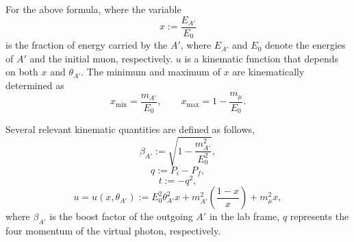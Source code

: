 \documentclass[onecolumn, aps, nofootinbib, prd, preprint, floats, floatfix, amsmath, amssymb, superscriptaddress, preprintnumbers]{revtex4-1}
\begin{document}
For the above formula, where the variable
\begin{equation}
x := \frac{E_{A'}}{E_0}
\label{eq:NA64x}
\end{equation}
is the fraction of energy carried by the $A'$, where $E_{A'}$ and $E_0$ denote the energies of $A'$ and the initial muon, respectively. $u$ is a kinematic function that depends on both $x$ and $\theta_{A'}$.  The minimum and maximum of $x$ are kinematically determined as ~\cite{kirpichnikov2021probing}
\begin{equation}
x_{\min} = \frac{m_{A'}}{E_0}, \qquad x_{\max} = 1 - \frac{m_{\mu}}{E_0}.
\label{eq:xmax}
\end{equation}

Several relevant kinematic quantities are defined as follows,
\begin{equation}
\beta_{A'} := \sqrt{1 - \frac{m_{A'}^2}{E_0^2}},
\label{eq:beta}
\end{equation}
\begin{equation}
q := P_i - P_f,
\label{q}
\end{equation}
\begin{equation}
t := -q^2,
\label{t}
\end{equation}
\begin{equation}
    u = u(x, \theta_{A'}) := E_0^2 \theta_{A'}^2 x + m_{A'}^2 \left( \frac{1-x}{x} \right) + m_\mu^2 x,
    \label{u}
\end{equation}
where $\beta_{A'}$ is the boost factor of the outgoing $A'$ in the lab frame, $q$ represents the four momentum of the virtual photon, respectively.
\end{document}
